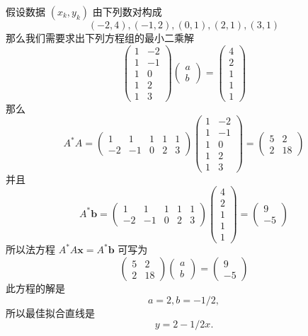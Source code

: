 假设数据 $(x_k, y_k)$ 由下列数对构成
\[ (-2,4), (-1,2), (0,1), (2,1), (3,1)\]
那么我们需要求出下列方程组的最小二乘解
$$\left(\begin{array}{rr}
1 & -2 \\
1 & -1 \\
1 & 0 \\
1 & 2 \\
1 & 3
\end{array}\right)\left(\begin{array}{l}
a \\
b
\end{array}\right)=\left(\begin{array}{l}
4 \\
2 \\
1 \\
1 \\
1
\end{array}\right)$$
那么
$$A^{*} A=\left(\begin{array}{rrrrr}
1 & 1 & 1 & 1 & 1 \\
-2 & -1 & 0 & 2 & 3
\end{array}\right)\left(\begin{array}{rrrrr}
1 & -2 \\
1 & -1 \\
1 & 0 \\
1 & 2 \\
1 & 3
\end{array}\right)=\left(\begin{array}{rr}
5 & 2 \\
2 & 18
\end{array}\right)$$
并且
$$A^{*} \mathbf{b}=\left(\begin{array}{rrrrr}
1 & 1 & 1 & 1 & 1 \\
-2 & -1 & 0 & 2 & 3
\end{array}\right)\left(\begin{array}{l}
4 \\
2 \\
1 \\
1 \\
1
\end{array}\right)=\left(\begin{array}{r}
9 \\
-5
\end{array}\right)$$
所以法方程 $A^{*} A \mathbf{x}=A^{*} \mathbf{b}$ 可写为
$$\left(\begin{array}{rr}
5 & 2 \\
2 & 18
\end{array}\right)\left(\begin{array}{l}
a \\
b
\end{array}\right)=\left(\begin{array}{r}
9 \\
-5
\end{array}\right)$$
此方程的解是
$$a=2, b=-1 / 2,$$
所以最佳拟合直线是
$$
y=2-1 / 2 x.$$

